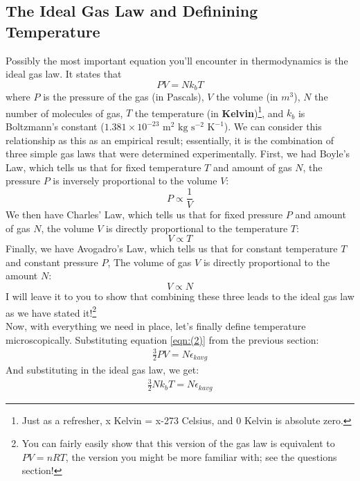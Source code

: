 \subsection{The Ideal Gas Law and Definining Temperature}
Possibly the most important equation you'll encounter in thermodynamics is the ideal gas law. It states that
\begin{equation}
    \label{eqn:(4)}
    PV=Nk_{b}T
\end{equation}
where $P$ is the pressure of the gas (in Pascals), $V$ the volume (in $m^3$), $N$ the number of molecules of gas, $T$ the temperature (in \textbf{Kelvin})\footnote{Just as a refresher, x Kelvin = x-273 Celsius, and 0 Kelvin is absolute zero.}, and $k_b$ is Boltzmann's constant ($1.381 \times 10^{-23} \textrm{ m}^2 \textrm{ kg} \textrm{ s}^{-2} \textrm{ K}^{-1}$). We can consider this relationship as this as an empirical result; essentially, it is the combination of three simple gas laws that were determined experimentally. First, we had Boyle's Law, which tells us that for fixed temperature $T$ and amount of gas $N$, the pressure $P$ is inversely proportional to the volume $V$:
\begin{equation}
    P \propto \frac{1}{V}
\end{equation}
We then have Charles' Law, which tells us that for fixed pressure $P$ and amount of gas $N$, the volume $V$ is directly proportional to the temperature $T$:
\begin{equation}
    V \propto T
\end{equation}
Finally, we have Avogadro's Law, which tells us that for constant temperature $T$ and constant pressure $P$, The volume of gas $V$ is directly proportional to the amount $N$:
\begin{equation}
    V \propto N
\end{equation}
I will leave it to you to show that combining these three leads to the ideal gas law as we have stated it!\footnote{You can fairly easily show that this version of the gas law is equivalent to $PV=nRT$, the version you might be more familiar with; see the questions section!} \\
\noindent
Now, with everything we need in place, let's finally define temperature microscopically. Substituting equation \ref{eqn:(2)} from the previous section:
\begin{align*}
    \frac{3}{2}PV=N\epsilon_{kavg}
\end{align*}
And substituting in the ideal gas law, we get:
\begin{align*}
    \frac{3}{2}Nk_bT = N\epsilon_{kavg}
\end{align*}
